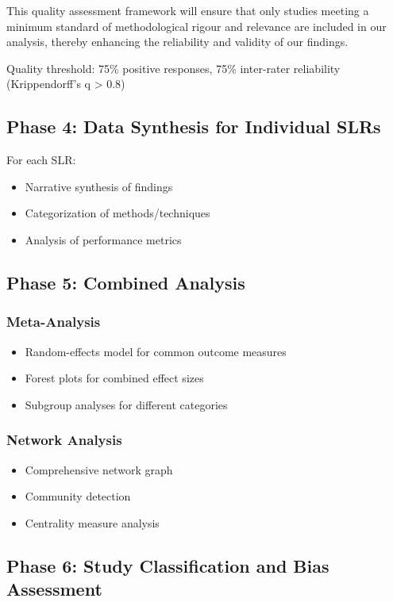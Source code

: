\documentclass[a4paper,12pt]{article}
\begin{document}
This quality assessment framework will ensure that only studies meeting a minimum standard of methodological rigour and relevance are included in our analysis, thereby enhancing the reliability and validity of our findings.

Quality threshold: 75\% positive responses, 75\% inter-rater reliability (Krippendorff's q > 0.8)

\subsection{Phase 4: Data Synthesis for Individual SLRs}

For each SLR:
\begin{itemize}
    \item Narrative synthesis of findings
    \item Categorization of methods/techniques
    \item Analysis of performance metrics
\end{itemize}

\subsection{Phase 5: Combined Analysis}

\subsubsection{Meta-Analysis}
\begin{itemize}
    \item Random-effects model for common outcome measures
    \item Forest plots for combined effect sizes
    \item Subgroup analyses for different categories
\end{itemize}

\subsubsection{Network Analysis}
\begin{itemize}
    \item Comprehensive network graph
    \item Community detection
    \item Centrality measure analysis
\end{itemize}

\subsection{Phase 6: Study Classification and Bias Assessment}
\end{document}
